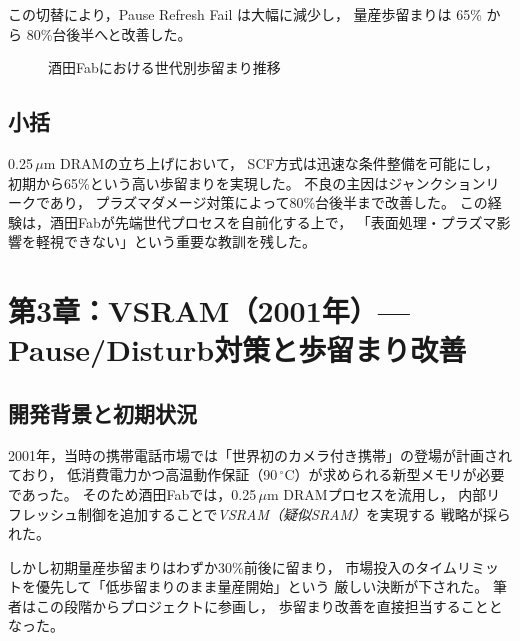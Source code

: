 \documentclass[conference]{IEEEtran}
\begin{document}
この切替により，Pause Refresh Fail は大幅に減少し，
量産歩留まりは 65\% から 80\%台後半へと改善した。

\begin{figure}[t]
\centering
{}
\caption{酒田Fabにおける世代別歩留まり推移}
\label{fig:yield_trend}
\end{figure}

\subsection{小括}
0.25\,$\mu$m DRAMの立ち上げにおいて，
SCF方式は迅速な条件整備を可能にし，
初期から65\%という高い歩留まりを実現した。
不良の主因はジャンクションリークであり，
プラズマダメージ対策によって80\%台後半まで改善した。
この経験は，酒田Fabが先端世代プロセスを自前化する上で，
「表面処理・プラズマ影響を軽視できない」という重要な教訓を残した。

\section{第3章：VSRAM（2001年）— Pause/Disturb対策と歩留まり改善}

\subsection{開発背景と初期状況}
2001年，当時の携帯電話市場では「世界初のカメラ付き携帯」の登場が計画されており，
低消費電力かつ高温動作保証（90\,$^\circ$C）が求められる新型メモリが必要であった。
そのため酒田Fabでは，0.25\,$\mu$m DRAMプロセスを流用し，
内部リフレッシュ制御を追加することで\emph{VSRAM（疑似SRAM）}を実現する
戦略が採られた。

しかし初期量産歩留まりはわずか30\%前後に留まり，
市場投入のタイムリミットを優先して「低歩留まりのまま量産開始」という
厳しい決断が下された。
筆者はこの段階からプロジェクトに参画し，
歩留まり改善を直接担当することとなった。
\end{document}
